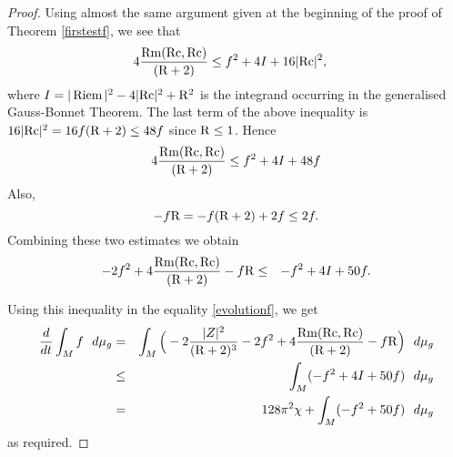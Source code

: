 \documentclass{amsart}
\numberwithin{equation}{section}
\theoremstyle{definition}
\theoremstyle{remark}
\begin{document}
\begin{proof}
Using almost the same argument given at the beginning of the proof of
Theorem \ref{firstestf}, we see that
\begin{equation}
\begin{split}
 4 \frac{\operatorname{Rm}({{\rm{Rc}}},{{\rm{Rc}}})}{({{\rm R}}+2)} 
& \leq  f^2 + 4 I + 16 |{{\rm{Rc}}}|^2,
\end{split}
\end{equation}
where $I =  |\operatorname{Riem}|^2 -4 |{{\rm{Rc}}}|^2
+ {{\rm R}}^2$ is the integrand occurring in the generalised Gauss-Bonnet
Theorem.
The last term of the above inequality is
$ 16 |{{\rm{Rc}}}|^2 = 16 f ({{\rm R}} + 2) \leq 48 f$ since ${{\rm R}} \leq 1$.
Hence 
\begin{equation}
\begin{split}
 4 \frac{\operatorname{Rm}({{\rm{Rc}}},{{\rm{Rc}}})}{({{\rm R}}+2)}  \leq f^2 + 4  I  + 48f
\end{split}
\end{equation}
Also,
\begin{equation}
-f  {{\rm R}} = -f  ({{\rm R}} +2) + 2f   \leq 2f.
\end{equation}
Combining these two estimates we obtain
\begin{eqnarray}
 -2 f^2  +  4\frac {\operatorname{Rm}({{\rm{Rc}}},{{\rm{Rc}}})}{({{\rm R}}+2)}
- f {{\rm R}}  &\leq& - f^2  +  4 I + 50f.
\end{eqnarray}

Using this inequality in the equality \eqref{evolutionf},  we get
\begin{eqnarray*}
{\frac{d}{d t}} \int_M  f \ \ d\mu_g &=&\int_M \Big( -2\frac{|Z |^2}{({{\rm R}}+2)^3} 
 -2 f^2  +  4\frac {\operatorname{Rm}({{\rm{Rc}}},{{\rm{Rc}}})}{({{\rm R}}+2)}
- f {{\rm R}} \Big) \ \ d\mu_g \\
&\leq&\int_M ( -f^2 + 4 I +   50 f) \ \ d\mu_g\cr
&=&128 \pi^2 \chi + \int_M ( -f^2 +   50 f)  \ \ d\mu_g
\end{eqnarray*}
as required.
\end{proof}
\end{document}
